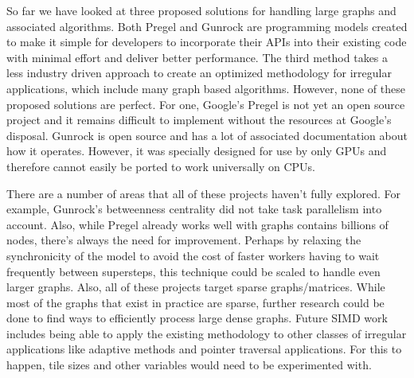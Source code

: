 \documentclass[conference]{IEEEtran}
\begin{document}
So far we have looked at three proposed solutions for handling large graphs and associated algorithms.  Both Pregel and Gunrock are programming models created to make it simple for developers to incorporate their APIs into their existing code with minimal effort and deliver better performance.  The third method takes a less industry driven approach to create an optimized methodology for irregular applications, which include many graph based algorithms.  However, none of these proposed solutions are perfect.  For one, Google's Pregel is not yet an open source project and it remains difficult to implement without the resources at Google's disposal.  Gunrock is open source and has a lot of associated documentation about how it operates.  However, it was specially designed for use by only GPUs and therefore cannot easily be ported to work universally on CPUs.  

There are a number of areas that all of these projects haven't fully explored.  For example, Gunrock's betweenness centrality did not take task parallelism into account.  Also, while Pregel already works well with graphs contains billions of nodes, there's always the need for improvement.  Perhaps by relaxing the synchronicity of the model to avoid the cost of faster workers having to wait frequently between supersteps, this technique could be scaled to handle even larger graphs.  Also, all of these projects target sparse graphs/matrices.  While most of the graphs that exist in practice are sparse, further research could be done to find ways to efficiently process large dense graphs.  Future SIMD work includes being able to apply the existing methodology to other classes of irregular applications like adaptive methods and pointer traversal applications.  For this to happen, tile sizes and other variables would need to be experimented with.  
\end{document}
